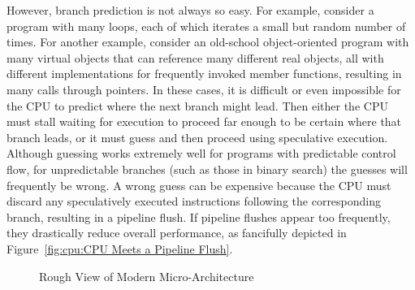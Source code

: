 However, branch prediction is not always so easy.
For example, consider a program with many loops, each of which iterates
a small but random number of times.
For another example, consider an old-school object-oriented program with
many virtual objects that can reference many different real objects, all
with different implementations for frequently invoked member functions,
resulting in many calls through pointers.
In these cases, it is difficult or even
impossible for the CPU to predict where the next branch might lead.
Then either the CPU must stall waiting for execution to proceed far
enough to be certain where that branch leads, or it must guess and
then proceed using speculative execution.
Although guessing works extremely well for programs with predictable
control flow, for unpredictable branches (such as those in binary search)
the guesses will frequently be wrong.
A wrong guess can be expensive because the CPU must discard any
speculatively executed instructions following the corresponding
branch, resulting in a pipeline flush.
If pipeline flushes appear too frequently, they drastically reduce
overall performance, as fancifully depicted in
Figure~\ref{fig:cpu:CPU Meets a Pipeline Flush}.

\fi

\begin{figure}[tb]
\centering
{}
\caption{Rough View of Modern Micro-Architecture}
\label{fig:cpu:Rough View of Modern Micro-Architecture}
\end{figure}

